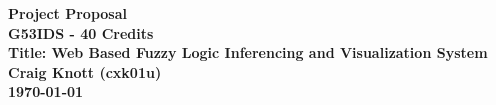 \documentclass[a4paper,twoside,notitlepage,11pt]{article}
\begin{document}

\pagestyle{empty}
\begin{center}
 {\LARGE \textbf{Project Proposal} \\ [0.2cm]}
 \textbf{G53IDS - 40 Credits}\\
   \textbf{Title: Web Based Fuzzy Logic Inferencing and Visualization System}\\
    \textbf{Craig Knott (cxk01u)} \\
	 \textbf{\today}
\end{center}
\end{document}

